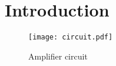 \section{Introduction}
\label{sec:intro}




\begin{figure} [!htb] 
  \texttt{[image: circuit.pdf]}
  \caption{Amplifier circuit}
  \label{fig:theoplots}
  \endminipage\hfill
\end{figure}


